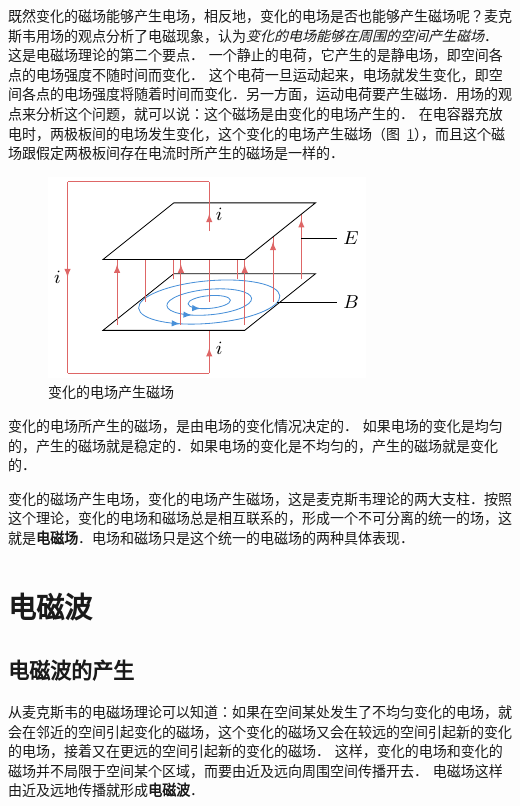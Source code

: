 既然变化的磁场能够产生电场，相反地，变化的电场是否也能够产生磁场呢？麦克斯韦用场的观点分析了电磁现象，认为\textit{变化的电场能够在周围的空间产生磁场}．
这是电磁场理论的第二个要点．
一个静止的电荷，它产生的是静电场，即空间各点的电场强度不随时间而变化．
这个电荷一旦运动起来，电场就发生变化，即空间各点的电场强度将随着时间而变化．另一方面，运动电荷要产生磁场．用场的观点来分析这个问题，就可以说：这个磁场是由变化的电场产生的．
在电容器充放电时，两极板间的电场发生变化，这个变化的电场产生磁场（图~\ref{fig_C_4-5}），而且这个磁场跟假定两极板间存在电流时所产生的磁场是一样的．
\begin{figure}[htbp]
    \centering
    \includegraphics{fig/C/4-5.pdf}
    \caption{变化的电场产生磁场}\label{fig_C_4-5}
\end{figure}


变化的电场所产生的磁场，是由电场的变化情况决定的．
如果电场的变化是均匀的，产生的磁场就是稳定的．如果电场的变化是不均匀的，产生的磁场就是变化的．

变化的磁场产生电场，变化的电场产生磁场，这是麦克斯韦理论的两大支柱．按照这个理论，变化的电场和磁场总是相互联系的，形成一个不可分离的统一的场，这就是\textbf{电磁场}．电场和磁场只是这个统一的电磁场的两种具体表现．

\section{电磁波}
\subsection{电磁波的产生}

从麦克斯韦的电磁场理论可以知道：如果在空间某处发生了不均匀变化的电场，就会在邻近的空间引起变化的磁场，这个变化的磁场又会在较远的空间引起新的变化的电场，接着又在更远的空间引起新的变化的磁场．
这样，变化的电场和变化的磁场并不局限于空间某个区域，而要由近及远向周围空间传播开去．
电磁场这样由近及远地传播就形成\textbf{电磁波}．



